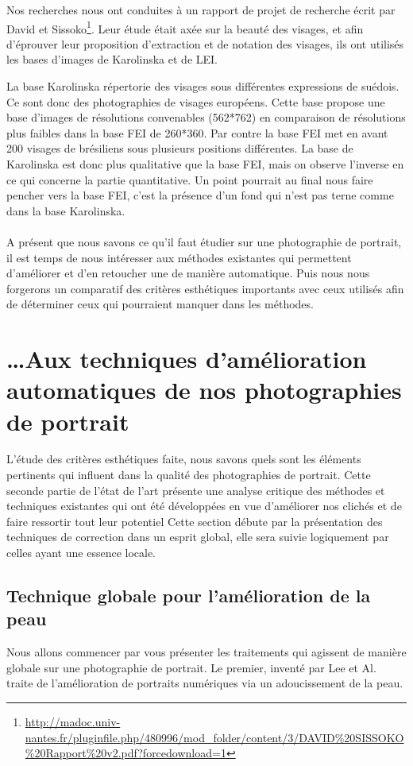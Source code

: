 \documentclass[11pt, french,screen]{report-rd-info}
\begin{document}
Nos recherches nous ont conduites à un rapport de projet de recherche écrit par David et Sissoko\footnote{\url{http://madoc.univ-nantes.fr/pluginfile.php/480996/mod_folder/content/3/DAVID\%20SISSOKO\%20Rapport\%20v2.pdf?forcedownload=1}}. Leur étude était axée sur la beauté des visages, et afin d'éprouver leur proposition d'extraction et de notation des visages, ils ont utilisés les bases d'images de Karolinska et de LEI.

La base Karolinska répertorie des visages sous différentes expressions de suédois. Ce sont donc des photographies de visages européens. Cette base propose une base d'images de résolutions convenables (562*762) en comparaison de résolutions plus faibles dans la base FEI de 260*360. Par contre la base FEI met en avant 200 visages de brésiliens sous plusieurs positions différentes. La base de Karolinska est donc plus qualitative que la base FEI, mais on observe l'inverse en ce qui concerne la partie quantitative. Un point pourrait au final nous faire pencher vers la base FEI, c'est la présence d'un fond qui n'est pas terne comme dans la base Karolinska.
\paragraph*{}
A présent que nous savons ce qu'il faut étudier sur une photographie de portrait, il est temps de nous intéresser aux méthodes existantes qui permettent d'améliorer et d’en retoucher une de manière automatique. Puis nous nous forgerons un comparatif des critères esthétiques importants avec ceux utilisés afin de déterminer ceux qui pourraient manquer dans les méthodes.
\section{\ldots Aux techniques d’amélioration automatiques de nos photographies de portrait}
L’étude des critères esthétiques faite, nous savons quels sont les éléments pertinents qui influent dans la qualité des photographies de portrait. Cette seconde partie de l’état de l’art présente une analyse critique des méthodes et techniques existantes qui ont été développées en vue d’améliorer nos clichés et de faire ressortir tout leur potentiel
Cette section débute par la présentation des techniques de correction dans un esprit global, elle sera suivie logiquement par celles ayant une essence locale.
\subsection{Technique globale pour l’amélioration de la peau}
Nous allons commencer par vous présenter les traitements qui agissent de manière globale sur une photographie de portrait. Le premier, inventé par Lee et Al.\cite{Lee} traite de l'amélioration de portraits numériques via un adoucissement de la peau.
\end{document}
